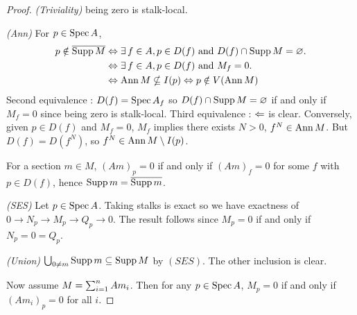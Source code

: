 \begin{proof}
  \textit{(Triviality)} being zero is stalk-local. 

  \textit{(Ann)}
  For $p \in \operatorname{Spec} A$,
  \begin{align*}
    p \notin \overline{\operatorname{Supp} M}
    &\Leftrightarrow \exists\, f \in A, p \in D(f) \text{ and } 
    D(f) \cap \operatorname{Supp} M = \varnothing. \\
    &\Leftrightarrow \exists\, f \in A, p \in D(f) \text{ and } M_f = 0. \\
    &\Leftrightarrow \operatorname{Ann} M \nsubseteq I(p) \Leftrightarrow p \notin V(\operatorname{Ann} M)
  \end{align*}
  Second equivalence : 
  $D(f) = \operatorname{Spec} A_f$ so $D(f) \cap \operatorname{Supp} M = \varnothing$ if and only if 
  $M_f = 0$ since being zero is stalk-local. 
  Third equivalence : 
  $\Leftarrow$ is clear. 
  Conversely, given $p \in D(f)$ and $M_f = 0$,
  $M_f$ implies there exists $N > 0$, $f^N \in \operatorname{Ann} M$. 
  But $D(f) = D(f^N)$, so $f^N \in \operatorname{Ann} M \setminus I(p)$.

  For a section $m \in M$,
  $(Am)_p = 0$ if and only if $(Am)_f = 0$ for some $f$ with $p \in D(f)$,
  hence $\operatorname{Supp} m = \overline{\operatorname{Supp} m}$.

  \textit{(SES)}
  Let $p \in \operatorname{Spec} A$.
  Taking stalks is exact so we have exactness of 
  $0 \to N_p \to M_p \to Q_p \to 0$.
  The result follows since $M_p = 0$ if and only if $N_p = 0 = Q_p$. 

  \textit{(Union)}
  $\bigcup_{0 \neq m} \operatorname{Supp} m \subseteq \operatorname{Supp} M$ by $(SES)$.
  The other inclusion is clear. 

  Now assume $M = \sum_{i = 1}^{n} Am_i$. 
  Then for any $p \in \operatorname{Spec} A$,
  $M_p = 0$ if and only if $(Am_i)_p = 0$ for all $i$. 


\end{proof}

